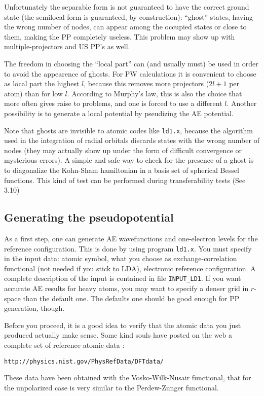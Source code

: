 Unfortunately the separable form is not guaranteed to have the
correct ground state (the semilocal form is guaranteed, by 
construction): ``ghost'' states, having the wrong number of nodes, 
can appear among the occupied states or close to them, making the 
PP completely useless. This problem may show up with  multiple-projectors 
and US PP's as well.

The freedom in choosing the ``local part'' can (and usually must) be used 
in order to avoid the appearence of ghosts. For PW calculations it is 
convenient to choose as local part the highest $l$, because this removes
more projectors ($2l+1$ per atom) than for low $l$. According to Murphy's 
law, this is also the choice that more often gives raise to problems, 
and one is forced to use a different $l$. Another possibility is to generate 
a local potential by pseudizing the AE potential.

Note that ghosts are invisible to atomic codes like {\tt ld1.x},
because the algorithm used in the integration of radial orbitals discards 
states with the wrong number of nodes (they may actually show up under
the form of difficult convergence or mysterious errors). 
A simple and safe way to check for the presence of a ghost is to diagonalize 
the Kohn-Sham hamiltonian in a basis set of spherical Bessel functions. 
This kind of test can be performed during transferability tests (See 3.10)

\subsection{Generating the pseudopotential}

As a first step, one can generate AE wavefunctions and one-electron 
levels for the reference configuration. This is done by using program
{\tt ld1.x}. You must specify in the input data: atomic symbol, 
what you choose as exchange-correlation functional (not needed 
if you stick to LDA), electronic reference configuration.
A complete description of the input is contained in file
{\tt INPUT\_LD1}. If you want accurate AE results for heavy atoms,
you may want to specify a denser grid in $r$-space than the default
one. The defaults one should be good enough for PP generation, though.

Before you proceed, it is a good idea to verify that the atomic data
you just produced actually make sense. Some kind souls have posted on
the web a complete set of reference atomic data :

{\tt http://physics.nist.gov/PhysRefData/DFTdata/ }
\par\noindent
These data have been obtained with the Vosko-Wilk-Nusair functional,
that for the unpolarized case is very similar to the Perdew-Zunger 
functional.

